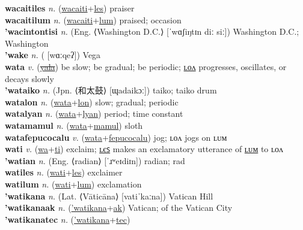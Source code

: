 \textbf{wacaitiles} \textit{n.} (\hyperref[wacaiti]{wacaiti}+\hyperref[les]{les})
praiser \label{wacaitiles} \\
\textbf{wacaitilum} \textit{n.} (\hyperref[wacaiti]{wacaiti}+\hyperref[lum]{lum})
praised; occasion \label{wacaitilum} \\
\textbf{'wacintontisi} \textit{n.} (Eng. ⟨Washington D.C.⟩ [ˈwɑʃiŋtɪn diː siː])
Washington D.C.; Washington \label{'wacintontisi} \\
\textbf{'wake} \textit{n.} ( [wɑːqeʔ])
Vega \label{'wake} \\
\textbf{wata} \textit{v.} (\hyperref[yala]{\sout{yala}})
be slow; be gradual; be periodic; \hyperref[watalon]{ʟᴏᴧ} progresses, oscillates, or decays slowly \label{wata} \\
\textbf{'wataiko} \textit{n.} (Jpn. ⟨和太鼓⟩ [ɰadaikɔː])
taiko; taiko drum \label{'wataiko} \\
\textbf{watalon} \textit{n.} (\hyperref[wata]{wata}+\hyperref[lon]{lon})
slow; gradual; periodic \label{watalon} \\
\textbf{watalyan} \textit{n.} (\hyperref[wata]{wata}+\hyperref[lyan]{lyan})
period; time constant \label{watalyan} \\
\textbf{watamamul} \textit{n.} (\hyperref[wata]{wata}+\hyperref[mamul]{mamul})
sloth \label{watamamul} \\
\textbf{watafepucocalu} \textit{v.} (\hyperref[wata]{wata}+\hyperref[fepucocalu]{fepucocalu})
jog; ʟᴏᴧ jogs on ʟᴜᴍ \label{watafepucocalu} \\
\textbf{wati} \textit{v.} (\hyperref[wa]{wa}+\hyperref[ti]{ti})
exclaim; \hyperref[watiles]{ʟєꜱ} makes an exclamatory utterance of \hyperref[watilum]{ʟᴜᴍ} to ʟᴏᴧ \label{wati} \\
\textbf{'watian} \textit{n.} (Eng. ⟨radian⟩ [ˈɹʷeɪdiɪn])
radian; rad \label{'watian} \\
\textbf{watiles} \textit{n.} (\hyperref[wati]{wati}+\hyperref[les]{les})
exclaimer \label{watiles} \\
\textbf{watilum} \textit{n.} (\hyperref[wati]{wati}+\hyperref[lum]{lum})
exclamation \label{watilum} \\
\textbf{'watikana} \textit{n.} (Lat. ⟨Vāticāna⟩ [vatiˈkaːna])
Vatican Hill \label{'watikana} \\
\textbf{'watikanaak} \textit{n.} (\hyperref['watikana]{'watikana}+\hyperref[ak]{ak})
Vatican; of the Vatican City \label{'watikanaak} \\
\textbf{'watikanatec} \textit{n.} (\hyperref['watikana]{'watikana}+\hyperref[tec]{tec})
